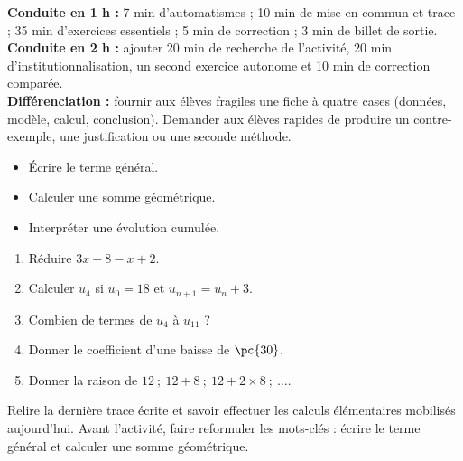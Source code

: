     \ifmxteacher
    \begin{method}
    \textbf{Conduite en 1 h :} 7 min d'automatismes ; 10 min de mise en commun et trace ; 35 min d'exercices essentiels ; 5 min de correction ; 3 min de billet de sortie.\\
    \textbf{Conduite en 2 h :} ajouter 20 min de recherche de l'activité, 20 min d'institutionnalisation, un second exercice autonome et 10 min de correction comparée.\\
    \textbf{Différenciation :} fournir aux élèves fragiles une fiche à quatre cases (données, modèle, calcul, conclusion). Demander aux élèves rapides de produire un contre-exemple, une justification ou une seconde méthode.
    \end{method}
    \fi
{}
\begin{objectives}\begin{itemize}\item Écrire le terme général.\item Calculer une somme géométrique.\item Interpréter une évolution cumulée.\end{itemize}\end{objectives}
\begin{fluency}\begin{enumerate}\item Réduire $3x+8-x+2$. \item Calculer $u_4$ si $u_0=18$ et $u_{n+1}=u_n+3$. \item Combien de termes de $u_{4}$ à $u_{11}$ ? \item Donner le coefficient d'une baisse de $\pc{30}$. \item Donner la raison de $12\ ;\ 12+8\ ;\ 12+2\times8\ ;\ \ldots$. \end{enumerate}\end{fluency}
\begin{prerequisites}Relire la dernière trace écrite et savoir effectuer les calculs élémentaires mobilisés aujourd'hui. Avant l'activité, faire reformuler les mots-clés : écrire le terme général et calculer une somme géométrique.\end{prerequisites}

